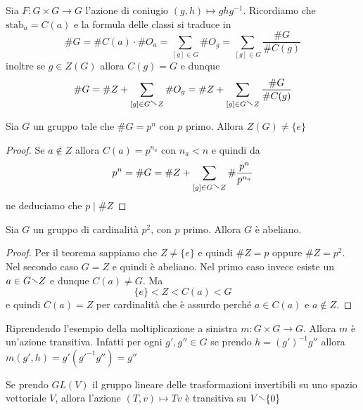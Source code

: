 \begin{corollary}\label{cor:classi_coniugio}
    Sia \(F : G \times G \to G\) l'azione di coniugio \({(g, h)} \mapsto
    ghg^{-1}\). Ricordiamo che \(\mathrm{stab}_a = C{(a)}\) e la formula delle
    classi si traduce in 
    \[
        \# G = \# C{(a)} \cdot \# O_a = \sum_{[g] \in G} \# O_g = \sum_{[g] \in
        G} \frac{\# G}{\# C{(g)}}
    \]
    inoltre se \(g \in Z{(G)}\) allora \(C{(g)} = G\) e dunque
    \begin{equation}\label{eq:formula_classi}
        \# G = \# Z + \sum_{[g] \in G\sminus Z} \# O_g = \# Z + \sum_{[g] \in G
        \sminus Z} \frac{\# G}{\# C{(g)}}
    \end{equation}
\end{corollary}
\begin{theorem}
    Sia \(G\) un gruppo tale che \(\# G = p^{n}\) con \(p\) primo. Allora
    \(Z{(G)} \neq \{e\} \) 
\end{theorem}
\begin{proof}
    Se \(a \not\in Z\) allora \(C{(a)} = p^{n_a}\) con \(n_a < n\) e quindi da
    \[
        p^{n} = \# G = \# Z + \sum_{[g] \in G\sminus Z} \# \frac{p^{n}}{p^{n_a}}
    \]
    ne deduciamo che \(p \mid \#Z\) 
\end{proof}
\begin{corollary}
    Sia \(G\) un gruppo di cardinalità \(p^2\), con \(p\) primo. Allora \(G\) è
    abeliano.
\end{corollary}
\begin{proof}
    Per il teorema sappiamo che \(Z \neq \{e\} \) e quindi \(\# Z = p\) oppure
    \(\# Z = p^2\). Nel secondo caso \(G = Z\) e quindi è abeliano. Nel primo
    caso invece esiste un \(a \in G \sminus Z\) e dunque \(C{(a)} \neq G\). Ma
    \[
        \{e\} < Z < C{(a)} < G
    \]
    e quindi \(C{(a)} = Z\) per cardinalità che è assurdo perché \(a \in
    C{(a)}\) e \(a \not\in Z\).
\end{proof}
\begin{example}
    Riprendendo l'esempio della moltiplicazione a sinistra \(m : G \times G \to
    G\). Allora \(m\) è un'azione transitiva. Infatti per ogni \(g', g'' \in G\) se
    prendo \(h = {(g')}^{-1} g''\) allora \(m {(g', h)} = g'{(g'^{-1} g'')} =
    g''\) 
\end{example}
\begin{example}
    Se prendo \(GL{(V)}\) il gruppo lineare delle trasformazioni invertibili su
    uno spazio vettoriale \(V\), allora l'azione \({(T, v)} \mapsto Tv\) è
    transitiva su \(V \sminus \{0\}\)  
\end{example}
